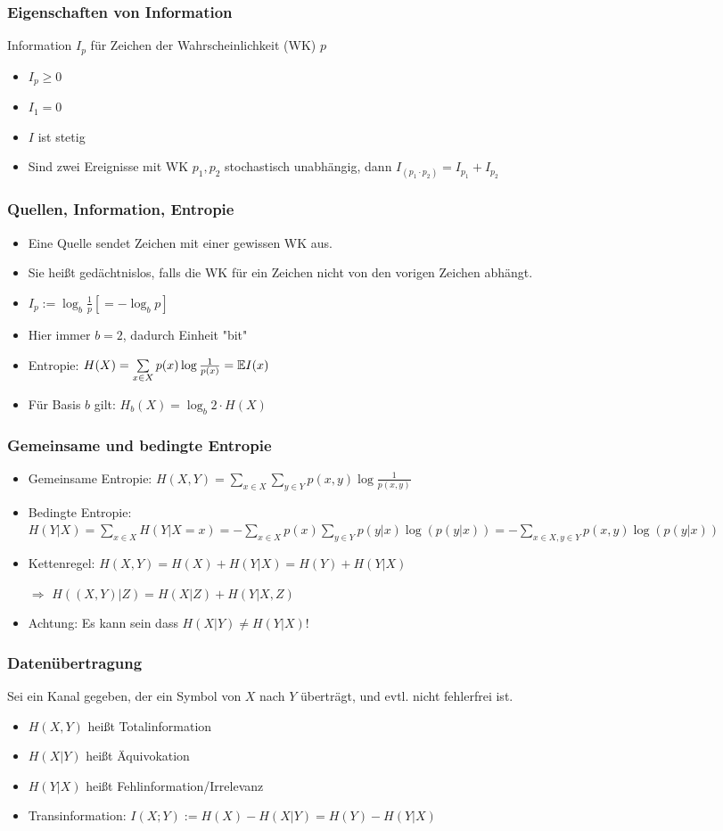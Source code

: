 \documentclass{beamer}
\newcommand{\E}{\ensuremath \mathbb{E}}
\begin{document}
\begin{frame}
\frametitle{Eigenschaften von Information}
Information $I_p$ für Zeichen der Wahrscheinlichkeit (WK) $p$
\begin{itemize}
\item $I_p\geq 0$
\item $I_1=0$
\item $I$ ist stetig
\item Sind zwei Ereignisse mit WK $p_1,p_2$ stochastisch unabhängig, dann $I_{(p_1\cdot p_2)}=I_{p_1}+I_{p_2}$
\end{itemize}
\end{frame}

\begin{frame}
\frametitle{Quellen, Information, Entropie}
\begin{itemize}
\item Eine Quelle sendet Zeichen mit einer gewissen WK aus.\pause
\item Sie heißt gedächtnislos, falls die WK für ein Zeichen nicht von den vorigen Zeichen abhängt.\pause
\item $I_p:=\log_b\frac{1}{p} [=-\log_b p]$
\item Hier immer $b=2$, dadurch Einheit "bit"\pause
\item Entropie: $H(X)=\sum\limits_{x\in X}p(x)\log\frac{1}{p(x)}=\E I(x)$\pause
\item Für Basis $b$ gilt: $H_b(X) = \log_b 2\cdot H(X)$
\end{itemize}
\end{frame}

\begin{frame}
\frametitle{Gemeinsame und bedingte Entropie}
\begin{itemize}
\item Gemeinsame Entropie: $H(X,Y)=\sum\limits_{x\in X}\sum\limits_{y\in Y}p(x,y)\log\frac{1}{p(x,y)}$\pause
\item Bedingte Entropie: $H(Y|X)=\sum\limits_{x\in X}H(Y|X=x)=-\sum\limits_{x\in X}p(x)\sum\limits_{y\in Y}p(y|x)\log(p(y|x))=-\sum\limits_{x\in X,y\in Y}p(x,y)\log(p(y|x))$
\pause
\item Kettenregel: $H(X,Y)=H(X)+H(Y|X)=H(Y)+H(Y|X)$
\item[$\Rightarrow$] $H((X,Y)|Z)=H(X|Z)+H(Y|X,Z)$
\item  Achtung: Es kann sein dass $H(X|Y)\neq H(Y|X)$!
\end{itemize}
\end{frame}

\begin{frame}
\frametitle{Datenübertragung}
Sei ein Kanal gegeben, der ein Symbol von $X$ nach $Y$ überträgt, und evtl. nicht fehlerfrei ist.
\begin{itemize}
\item $H(X,Y)$ heißt Totalinformation
\item $H(X|Y)$ heißt Äquivokation
\item $H(Y|X)$ heißt Fehlinformation/Irrelevanz\pause
\item Transinformation: $I(X;Y):=H(X)-H(X|Y)=H(Y)-H(Y|X)$
\end{itemize}
\end{frame}
\end{document}
